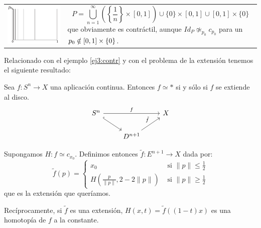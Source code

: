 \begin{ejems}
\begin{enumerate}
\begin{tabular}{ll}
\begin{minipage}{0.3\textwidth}
\includegraphics[width=\textwidth]{images/peine.pdf}
\end{minipage}
&
\begin{minipage}{0.6\textwidth}
\[ P = \bigcup_{n=1}^\infty \left( \left\lbrace \frac{1}{n} \right\rbrace \times [0, 1]\right) \cup \{ 0 \} \times [0, 1] \cup [0, 1] \times \{ 0 \} \]
que obviamente es contráctil, aunque $Id_P \not \simeq_{p_0} c_{p_0}$ para un $p_0 \notin [0, 1] \times \nobreak \{ 0 \} $.
\end{minipage}
\end{tabular}
\end{enumerate}

\end{ejems}
Relacionado con el ejemplo \ref{ej3:contr} y con el problema de la extensión tenemos el siguiente resultado:\\
\begin{teor}
Sea $f : S^n \longrightarrow X$ una aplicación continua. Entonces $f \simeq \ast$ si y sólo si $f$ se extiende al disco. 
\[
\begin{tikzcd}
	S^n \arrow{rr}{f} \drar[hook] & & X \\
		& D^{n+1} \urar{\tilde{f}}
\end{tikzcd}
\]
\end{teor}
\begin{demo}
Supongamos $H : f \simeq c_{x_0}$. Definimos entonces $\tilde{f} : E^{n+1} \longrightarrow X$ dada por:
\[
\tilde{f}(p )= 
\begin{cases}
	x_0 & \text{ si }\| p \| \leq \frac{1}{2} \\
	H(\frac{p}{\| p \|}, 2 - 2\| p \|) & \text{ si } \| p \| \geq \frac{1}{2}
\end{cases}
\]
que es la extensión que queríamos.

Recíprocamente, si $\tilde{f}$ es una extensión, $H(x, t) = \tilde{f}((1 - t)x)$ es una homotopía de $f$ a la constante. 
\end{demo}


